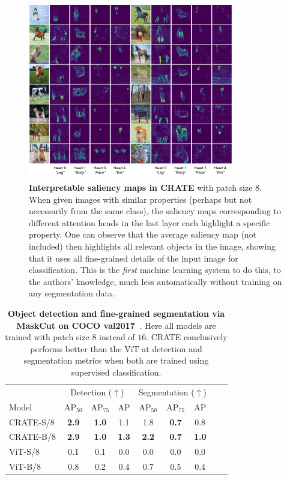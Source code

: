 \documentclass[../../book-main.tex]{subfiles}
\begin{document}
\begin{figure}
    \centering
    \includegraphics[width=0.8\textwidth]{figs_chap7/crate_semantic_heads.pdf}
    \caption{\small\textbf{Interpretable saliency maps in CRATE} with patch size \(8\). When given images with similar properties (perhaps but not necessarily from the same class), the saliency maps corresponding to different attention heads in the last layer each highlight a specific property. One can observe that the average saliency map (not included) then highlights all relevant objects in the image, showing that it uses all fine-grained details of the input image for classification. This is the \textit{first} machine learning system to do this, to the authors' knowledge, much less automatically without training on any segmentation data.}
    \label{fig:crate_semantic_heads}
\end{figure}

\begin{table}
    \centering
    \begin{tabular}{@{}lcccccccc@{}}
    \toprule
     &  \multicolumn{3}{c}{Detection (\(\uparrow\))} &  \multicolumn{3}{c}{Segmentation (\(\uparrow\))} \\ 
    Model & AP$_{50}$ & AP$_{75}$ & AP & AP$_{50}$ & AP$_{75}$ & AP  \\ 
    \midrule
    CRATE-S/8 & \textbf{2.9} & \textbf{1.0} & 1.1 & 1.8 & \textbf{0.7} & 0.8 \\
    CRATE-B/8 & \textbf{2.9} & \textbf{1.0} & \textbf{1.3} & \textbf{2.2} & \textbf{0.7} & \textbf{1.0} \\
    ViT-S/8 & 0.1& 0.1 & 0.0 & 0.0 & 0.0 & 0.0 \\
    ViT-B/8 & 0.8 & 0.2 & 0.4 & 0.7 & 0.5 & 0.4 \\
    \bottomrule
    \end{tabular}
    \caption{\small \textbf{Object detection and fine-grained segmentation via MaskCut on COCO {val2017}~\citep{lin2014microsoft}}. Here all models are trained with patch size \(8\) instead of \(16\). CRATE conclusively performs better than the ViT at detection and segmentation metrics when both are trained using supervised classification.}
    \label{tab:crate_detection_segmentation}
\end{table}
\end{document}
